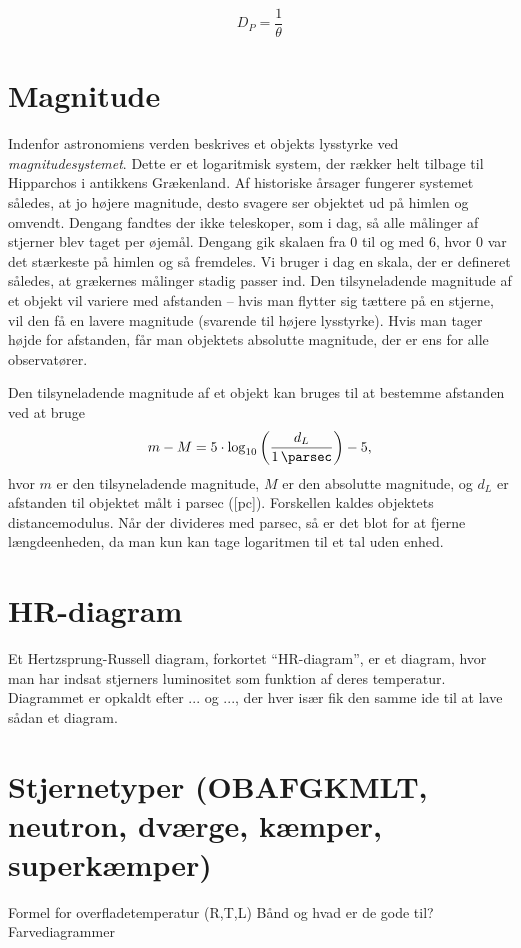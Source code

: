 \documentclass[crop=false, class=memoir]{standalone}
\begin{document}
\begin{equation}
    D_P = \frac{1}{\theta}
\end{equation}



\section{Magnitude}

Indenfor astronomiens verden beskrives et objekts lysstyrke ved \emph{magnitudesystemet}. Dette er et logaritmisk system, der rækker helt tilbage til Hipparchos i antikkens Grækenland. Af historiske årsager fungerer systemet således, at jo højere magnitude, desto svagere ser objektet ud på himlen og omvendt. Dengang fandtes der ikke teleskoper, som i dag, så alle målinger af stjerner blev taget per øjemål. Dengang gik skalaen fra 0 til og med 6, hvor 0 var det stærkeste på himlen og så fremdeles. Vi bruger i dag en skala, der er defineret således, at grækernes målinger stadig passer ind. Den tilsyneladende magnitude af et objekt vil variere med afstanden -- hvis man flytter sig tættere på en stjerne, vil den få en lavere magnitude (svarende til højere lysstyrke). Hvis man tager højde for afstanden, får man objektets absolutte magnitude, der er ens for alle observatører.
    
Den tilsyneladende magnitude af et objekt kan bruges til at bestemme afstanden ved at bruge
\begin{equation}
m-M=5\cdot \log_{10}\left(\frac{d_L}{\SI{1}{\parsec}}\right) - 5 ,
\end{equation}
hvor $m$ er den tilsyneladende magnitude, $M$ er den absolutte magnitude, og $d_L$ er afstanden til objektet målt i parsec ([pc]). Forskellen kaldes objektets distancemodulus. Når der divideres med parsec, så er det blot for at fjerne længdeenheden, da man kun kan tage logaritmen til et tal uden enhed.

\section{HR-diagram}

Et Hertzsprung-Russell diagram, forkortet ``HR-diagram'', er et diagram, hvor man har indsat stjerners luminositet som funktion af deres temperatur. Diagrammet er opkaldt efter ... og ..., der hver især fik den samme ide til at lave sådan et diagram.

\section{Stjernetyper (OBAFGKMLT, neutron, dværge, kæmper, superkæmper)}
Formel for overfladetemperatur (R,T,L)
Bånd og hvad er de gode til?
Farvediagrammer
\end{document}
